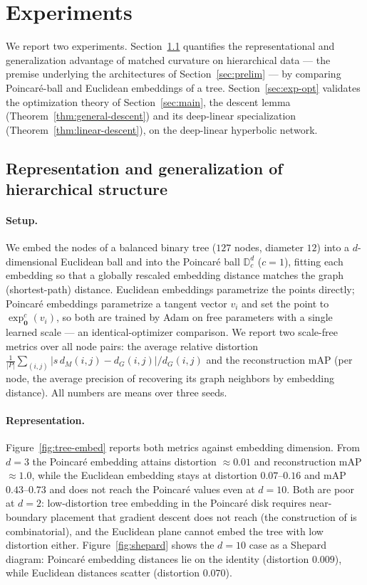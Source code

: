 \documentclass[letterpaper]{article}
\newcommand{\D}{\mathbb{D}}      %
\newcommand{\exps}{\exp_{\mathbf{0}}^c}
\begin{document}
\section{Experiments}
\label{sec:experiments}

We report two experiments. Section~\ref{sec:exp-embed} quantifies the
representational and generalization advantage of matched curvature on
hierarchical data --- the premise underlying the architectures of
Section~\ref{sec:prelim} --- by comparing Poincar\'e-ball and Euclidean
embeddings of a tree. Section~\ref{sec:exp-opt} validates the optimization
theory of Section~\ref{sec:main}, the descent lemma
(Theorem~\ref{thm:general-descent}) and its deep-linear specialization
(Theorem~\ref{thm:linear-descent}), on the deep-linear hyperbolic network.

\subsection{Representation and generalization of hierarchical structure}
\label{sec:exp-embed}

\paragraph{Setup.}
We embed the nodes of a balanced binary tree ($127$ nodes, diameter $12$)
into a $d$-dimensional Euclidean ball and into the Poincar\'e ball
$\D^d_c$ ($c=1$), fitting each embedding so that a globally rescaled
embedding distance matches the graph (shortest-path) distance. Euclidean
embeddings parametrize the points directly; Poincar\'e embeddings
parametrize a tangent vector $v_i$ and set the point to $\exps(v_i)$, so
both are trained by Adam on free parameters with a single learned scale ---
an identical-optimizer comparison. We report two scale-free metrics over all
node pairs: the average relative distortion
$\frac{1}{|P|}\sum_{(i,j)}|s\,d_M(i,j)-d_G(i,j)|/d_G(i,j)$ and the
reconstruction mAP (per node, the average precision of recovering its graph
neighbors by embedding distance). All numbers are means over three seeds.

\paragraph{Representation.}
Figure~\ref{fig:tree-embed} reports both metrics against embedding
dimension. From $d=3$ the Poincar\'e embedding attains distortion
$\approx 0.01$ and reconstruction mAP $\approx 1.0$, while the Euclidean
embedding stays at distortion $0.07$--$0.16$ and mAP $0.43$--$0.73$ and does
not reach the Poincar\'e values even at $d=10$. Both are poor at $d=2$:
low-distortion tree embedding in the Poincar\'e disk requires near-boundary
placement that gradient descent does not reach (the construction of
\cite{sala2018representation} is combinatorial), and the Euclidean plane
cannot embed the tree with low distortion either. Figure~\ref{fig:shepard}
shows the $d=10$ case as a Shepard diagram: Poincar\'e embedding distances
lie on the identity (distortion $0.009$), while Euclidean distances scatter
(distortion $0.070$).
\end{document}
